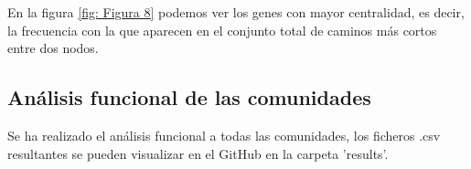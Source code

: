 \begin{minipage}{\linewidth}
	\label{fig: Figura 7}
\end{minipage}


En la figura \ref{fig: Figura 8} podemos ver los genes con mayor centralidad, es decir, la frecuencia con la que aparecen en el conjunto total de caminos más cortos entre dos nodos.

\begin{minipage}{\linewidth}
	\label{fig: Figura 8}
\end{minipage}



\subsection{Análisis funcional de las comunidades}
Se ha realizado el análisis funcional a todas las comunidades, los ficheros .csv resultantes se pueden visualizar en el GitHub en la carpeta 'results'.

